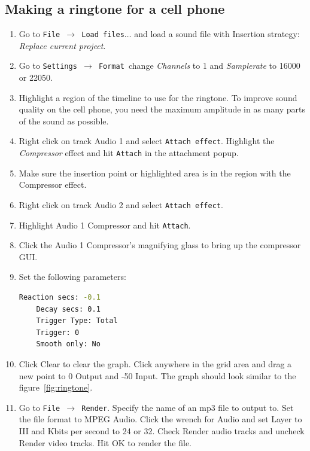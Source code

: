 \subsection{Making a ringtone for a cell phone}%
\label{sub:make_ringtone_phone}

\begin{enumerate}
	\item Go to \texttt{File $\rightarrow$ Load files$\dots$} and load a sound file with Insertion strategy: \textit{Replace current project}.
	\item Go to \texttt{Settings $\rightarrow$ Format }change \textit{Channels} to 1 and \textit{Samplerate} to 16000 or 22050.
	\item Highlight a region of the timeline to use for the ringtone. To improve sound quality on the cell
	phone, you need the maximum amplitude in as many parts of the sound as possible.
	\item Right click on track Audio 1 and select \texttt{Attach effect}. Highlight the \textit{Compressor} effect and hit
	\texttt{Attach} in the attachment popup.
	\item Make sure the insertion point or highlighted area is in the region with the Compressor effect.
	\item Right click on track Audio 2 and select \texttt{Attach effect}.
	\item Highlight Audio 1 Compressor and hit \texttt{Attach}.
	\item Click the Audio 1 Compressor's magnifying glass to bring up the compressor GUI.
	\item Set the following parameters:
	\begin{lstlisting}[language=bash,numbers=none]
	Reaction secs: -0.1
	Decay secs: 0.1
	Trigger Type: Total
	Trigger: 0
	Smooth only: No
	\end{lstlisting}
	\item Click Clear to clear the graph. Click anywhere in the grid area and drag a new point to 0 Output
	and -50 Input. The graph should look similar to the figure~\ref{fig:ringtone}.
	\item Go to \texttt{File $\rightarrow$ Render}. Specify the name of an mp3 file to output to. Set the file format to MPEG
	Audio. Click the wrench for Audio and set Layer to III and Kbits per second to 24 or 32. Check
	Render audio tracks and uncheck Render video tracks. Hit OK to render the file.
\end{enumerate}

